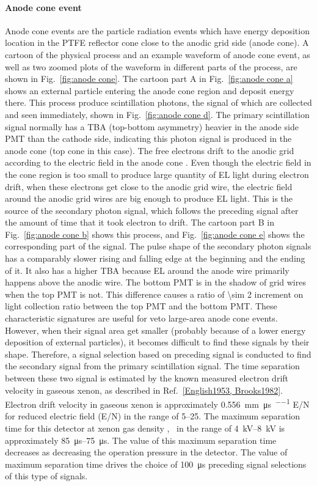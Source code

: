 \paragraph{Anode cone event} 
\label{sec:events particle anode cone}
Anode cone events are the particle radiation events which have energy deposition location in the PTFE reflector cone close to the anodic grid side (anode cone). A cartoon of the physical process and an example waveform of anode cone event, as well as two zoomed plots of the waveform in different parts of the process, are shown in Fig.~\ref{fig:anode cone}. The cartoon part A in Fig.~\ref{fig:anode cone a} shows an external particle entering the anode cone region and deposit energy there. This process produce scintillation photons, the signal of which are collected and seen immediately, shown in Fig.~\ref{fig:anode cone d}. The primary scintillation signal normally has a TBA (top-bottom asymmetry) heavier in the anode side PMT than the cathode side, indicating this photon signal is produced in the anode cone (top cone in this case). The free electrons drift to the anodic grid according to the electric field in the anode cone . Even though the electric field in the cone region is too small to produce large quantity of EL light during electron drift, when these electrons get close to the anodic grid wire, the electric field around the anodic grid wires are big enough to produce EL light. This is the source of the secondary photon signal, which follows the preceding signal after the amount of time that it took electron to drift. The cartoon part B in Fig.~\ref{fig:anode cone b} shows this process, and Fig.~\ref{fig:anode cone e} shows the corresponding part of the signal. The pulse shape of the secondary photon signals has a comparably slower rising and falling edge at the beginning and the ending of it. It also has a higher TBA because EL around the anode wire primarily happens above the anodic wire. The bottom PMT is in the shadow of grid wires when the top PMT is not. This difference causes a ratio of \num{\sim 2} increment on light collection ratio between the top PMT and the bottom PMT. These characteristic signatures are useful for veto large-area anode cone events. However, when their signal area get smaller (probably because of a lower energy deposition of external particles), it becomes difficult to find these signals by their shape. Therefore, a signal selection based on preceding signal is conducted to find the secondary signal from the primary scintillation signal. The time separation between these two signal is estimated by the known measured electron drift velocity in gaseous xenon, as described in Ref.~\ref{English1953, Brooks1982}. Electron drift velocity in gaseous xenon is approximately \SI{0.556}{\mm\per\us\per\townsend} E/N for reduced electric field (E/N) in the range of \SIrange{5}{25}{\townsend}. The maximum separation time for this detector at xenon gas density \standarddensity , \opvt\ in the range of \SIrange{+4}{+8}{\kV} is approximately \SIrange{85}{75}{\us}. The value of this maximum separation time decreases as decreasing the operation pressure in the detector. The value of maximum separation time drives the choice of \SI{100}{\us} preceding signal selections of this type of signals.  

